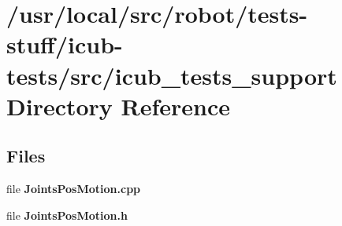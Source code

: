 \section{/usr/local/src/robot/tests-\/stuff/icub-\/tests/src/icub\-\_\-tests\-\_\-support Directory Reference}
\label{dir_2601342d55c4c5e30d8e324d15d5a992}
\subsection*{Files}
\begin{DoxyCompactItemize}
\item 
file {\bfseries Joints\-Pos\-Motion.\-cpp}
\item 
file {\bfseries Joints\-Pos\-Motion.\-h}
\end{DoxyCompactItemize}
